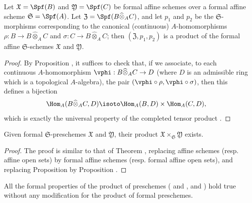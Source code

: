 \begin{proposition}[10.7.2]
\label{I.10.7.2}
Let $\mathfrak{X}=\Spf(B)$ and $\mathfrak{Y}=\Spf(C)$ be formal affine schemes over a formal affine scheme $\mathfrak{S}=\Spf(A)$.
Let $\mathfrak{Z}=\Spf(B\widehat{\otimes}_A C)$, and let $p_1$ and $p_2$ be the $\mathfrak{S}$-morphisms corresponding  to the canonical (continuous) $A$-homomorphisms $\rho: B\to B\widehat{\otimes}_A C$ and $\sigma:C\to B\widehat{\otimes}_A C$; then $(\mathfrak{Z},p_1,p_2)$ is a product of the formal affine $\mathfrak{S}$-schemes $\mathfrak{X}$ and $\mathfrak{Y}$.
\end{proposition}

\begin{proof}
By Proposition , it suffices to check that, if we associate, to each continuous $A$-homomorphism $\vphi:B\widehat{\otimes}_A C\to D$ (where $D$ is an admissible ring which is a topological $A$-algebra), the pair $(\vphi\circ\rho,\vphi\circ\sigma)$, then this defines a bijection
\[
  \Hom_A(B\widehat{\otimes}_A C,D)\isoto\Hom_A(B,D)\times\Hom_A(C,D),
\]
which is exactly the universal property of the completed tensor product .
\end{proof}

\begin{proposition}[10.7.3]
\label{I.10.7.3}
Given formal $\mathfrak{S}$-preschemes $\mathfrak{X}$ and $\mathfrak{Y}$, their product $\mathfrak{X}\times_\mathfrak{S}\mathfrak{Y}$ exists.
\end{proposition}

\begin{proof}
The proof is similar to that of Theorem , replacing affine schemes (resp. affine open sets) by formal affine schemes (resp. formal affine open sets), and replacing Proposition  by Proposition .
\end{proof}

All the formal properties of the product of preschemes ( and ,  and ) hold true without any modification for the product of formal preschemes.

